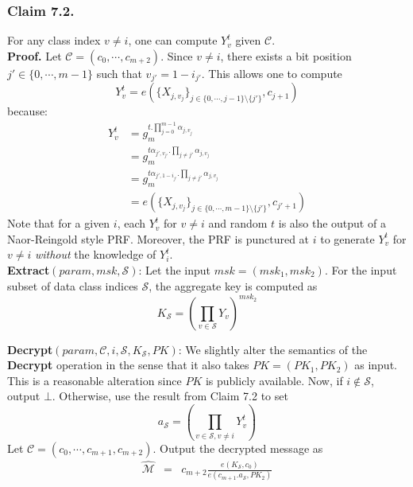 \subsubsection{Claim 7.2.} For any class index $v\neq i$, one can compute $Y^{t}_v$ given $\mathcal{C}$.\\

\noindent \textbf{Proof.} Let $\mathcal{C}=(c_0,\cdots,c_{m+2})$. Since $v\neq i$, there exists a bit position $j'\in\{0,\cdots,m-1\}$ such that $v_{j'}=1- i_{j'}$. This allows one to compute 
\begin{equation}
Y^{t}_v=e(\{X_{j,v_j}\}_{j\in\{0,\cdots,j-1\}\setminus\{j'\}},c_{j+1})\nonumber
\end{equation}
\noindent because:
\begin{equation}
\begin{split}
 Y^{t}_v &= g^{t.\prod_{j=0}^{m-1}\alpha_{j,v_{j}}}_m\\
 &=g^{t\alpha_{j',v_{j'}}.\prod_{j\neq j'}\alpha_{j,v_{j}}}_m\\
 &=g^{t\alpha_{j',1-i_{j'}}.\prod_{j\neq j'}\alpha_{j,v_{j}}}_m\\
 &=e(\{X_{j,v_j}\}_{j\in\{0,\cdots,m-1\}\setminus\{j'\}},c_{j'+1})\nonumber
\end{split}
\end{equation}
\noindent Note that for a given $i$, each $Y^{t}_v$ for $v\neq i$ and random $t$ is also the output of a Naor-Reingold style PRF. Moreover, the PRF is punctured at $i$ to generate $Y^{t}_v$ for $v\neq i$ \emph{without} the knowledge of $Y^{t}_i$.\\  
 
\noindent \textbf{Extract}$(param,msk,\mathcal{S})$: Let the input $msk=(msk_1,msk_2)$. For the input subset of data class indices $\mathcal{S}$, the aggregate key is computed as 
\begin{equation}
 K_{\mathcal{S}} = \left(\prod_{v\in\mathcal{S}}{Y_{v}}\right)^{msk_2}\nonumber
\end{equation} 

\noindent \textbf{Decrypt}$(param,\mathcal{C},i,\mathcal{S},K_{\mathcal{S}},PK)$: We slightly alter the semantics of the \textbf{Decrypt} operation in the sense that it also takes $PK=(PK_1,PK_2)$ as input. This is a reasonable alteration since $PK$ is publicly available. Now, if $i\notin\mathcal{S}$, output $\bot$. Otherwise, use the result from Claim 7.2 to set
\begin{equation}
a_{\mathcal{S}}=\left(\prod_{v\in\mathcal{S},v\neq i}Y^{t}_{v}\right)\nonumber
\end{equation}
Let $\mathcal{C}=(c_0,\cdots,c_{m+1},c_{m+2})$. Output the decrypted message as  
\begin{eqnarray} 
\hat{\mathcal{M}}&=&c_{m+2}\frac{{e}(K_{\mathcal{S}},c_0)}{{e}(c_{m+1}.a_{\mathcal{S}},PK_2)}\nonumber
\end{eqnarray}

